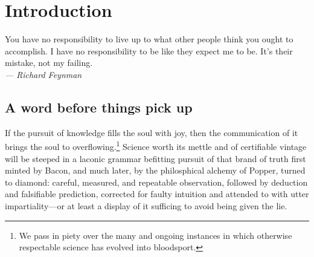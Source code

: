 
\chapter{Introduction}
\label{chp:1}

\begin{flushright}
  \begin{minipage}[]{0.5\linewidth}
    \begin{flushright}
      You have no responsibility to live up to what other people think you ought
      to accomplish. I have no responsibility to be like they expect me to
      be. It's their mistake, not my failing. \\{\small \emph{--- Richard Feynman} }
    \end{flushright}
  \end{minipage}
\end{flushright}
\vspace{\baselineskip}

\section{A word before things pick up}


If the pursuit of knowledge fills the soul with joy, then the
communication of it brings the soul to overflowing.\footnote{We pass
  in piety over the many and ongoing instances in which otherwise
  respectable science has evolved into bloodsport.} Science worth its
mettle and of certifiable vintage will be steeped in a laconic grammar
befitting pursuit of that brand of truth first minted by Bacon, and
much later, by the philosphical alchemy of Popper, turned to diamond:
careful, measured, and repeatable observation, followed by deduction
and falsifiable prediction, corrected for faulty intuition and
attended to with utter impartiality---or at least a display of it
sufficing to avoid being given the lie.

